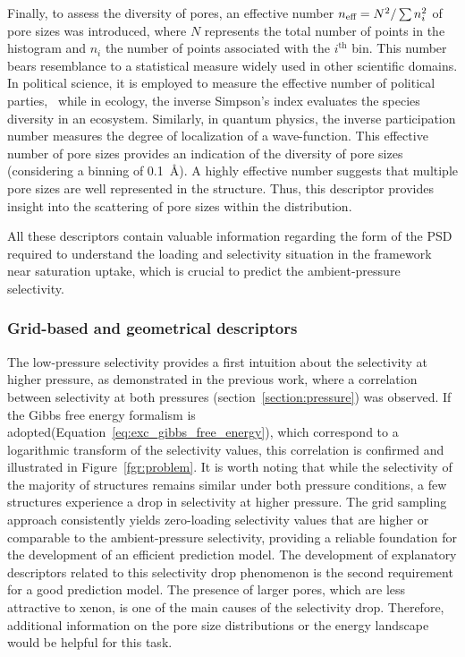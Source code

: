 \documentclass[main]{subfiles}
\begin{document}
Finally, to assess the diversity of pores, an effective number $n_{\text{eff}} = N^2/\sum n_i^2$ of pore sizes was introduced, where $N$ represents the total number of points in the histogram and $n_i$ the number of points associated with the $i^\text{th}$ bin. This number bears resemblance to a statistical measure widely used in other scientific domains. In political science, it is employed to measure the effective number of political parties,~\autocite{neffposci_Laakso1979} while in ecology, the inverse Simpson's index evaluates the species diversity in an ecosystem.\autocite{neffbio_Simpson1949} Similarly, in quantum physics, the inverse participation number measures the degree of localization of a wave-function.\autocite{neffphys_Kramer1993} This effective number of pore sizes provides an indication of the diversity of pore sizes (considering a binning of \SI{0.1}{\angstrom}). A highly effective number suggests that multiple pore sizes are well represented in the structure. Thus, this descriptor provides insight into the scattering of pore sizes within the distribution.

All these descriptors contain valuable information regarding the form of the PSD required to understand the loading and selectivity situation in the framework near saturation uptake, which is crucial to predict the ambient-pressure selectivity.

\subsubsection{Grid-based and geometrical descriptors}

The low-pressure selectivity provides a first intuition about the selectivity at higher pressure, as demonstrated in the previous work, where a correlation between selectivity at both pressures (section~\ref{section:pressure}) was observed. If the Gibbs free energy formalism is adopted(Equation~\ref{eq:exc_gibbs_free_energy}), which correspond to a logarithmic transform of the selectivity values, this correlation is confirmed and illustrated in Figure~\ref{fgr:problem}. It is worth noting that while the selectivity of the majority of structures remains similar under both pressure conditions, a few structures experience a drop in selectivity at higher pressure. The grid sampling approach consistently yields zero-loading selectivity values that are higher or comparable to the ambient-pressure selectivity, providing a reliable foundation for the development of an efficient prediction model. The development of explanatory descriptors related to this selectivity drop phenomenon is the second requirement for a good prediction model. The presence of larger pores, which are less attractive to xenon, is one of the main causes of the selectivity drop. Therefore, additional information on the pore size distributions or the energy landscape would be helpful for this task.
\end{document}
